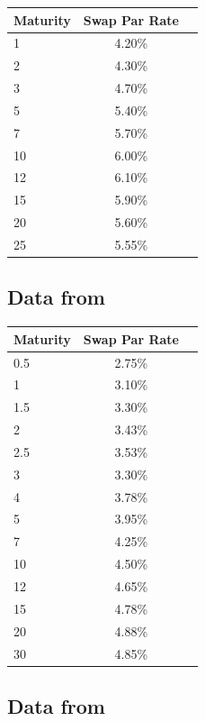 \medskip
\begin{center}
\begin{tabular}{|l|c|r|}
  \hline
  Maturity & Swap Par Rate \\
  \hline
  1 & 4.20\% \\
  2 & 4.30\%  \\
  3 & 4.70\%  \\
  5 & 5.40\%  \\
  7 & 5.70\%  \\
  10 & 6.00\%  \\
  12 & 6.10\%  \\
  15 & 5.90\%  \\
  20 & 5.60\%  \\
  25 & 5.55\%  \\
  \hline
\end{tabular}
\end{center}

\subsection{Data from \cite{andersen2007discount}}

\medskip
\begin{center}
\begin{tabular}{|l|c|r|}
  \hline
  Maturity & Swap Par Rate \\
  \hline
  0.5 & 2.75\% \\
  1 & 3.10\%  \\
  1.5 & 3.30\%  \\
  2 & 3.43\%  \\
  2.5 & 3.53\%  \\
  3 & 3.30\%  \\
  4 & 3.78\%  \\
  5 & 3.95\%  \\
  7 & 4.25\%  \\
  10 & 4.50\%  \\
  12 & 4.65\%  \\
  15 & 4.78\%  \\
  20 & 4.88\%  \\
  30 & 4.85\%  \\
  \hline
\end{tabular}
\end{center}

\subsection{Data from \cite{hagan2006interpolation}}

